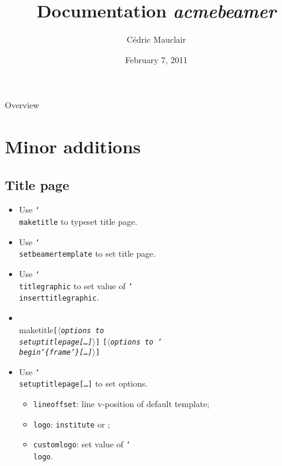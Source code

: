 \documentclass[utf8, a4paper]{beamer}
\newcommand*\cs[1]{\texttt{\char`\\#1}}
\newcommand*\meta[1]{\ensuremath{\langle}{\em#1}\ensuremath{\rangle}}
\newcommand*\oarg[1]{\texttt{[#1]}}
\newcommand*\benv[1]{\texttt{\char`\\begin\char`\{#1\char`\}}}
\newcommand*\pkg[1]{{\rmfamily\itshape #1}}
\let\type\texttt
\newcommand*\default[1]{\underbar{#1}}
\begin{document}
\title{Documentation \pkg{acmebeamer}}
\author{Cédric Mauclair}
\date{February 7, 2011}

\maketitle

\begin{frame}{Overview}
  \tableofcontents
\end{frame}

\section{Minor additions}

\subsection{Title page}

\begin{frame}[fragile]

  \begin{itemize}
  \item Use \cs{maketitle} to typeset title page.
  \item Use \cs{setbeamertemplate} to set title page.
  \item Use \cs{titlegraphic} to set value of \cs{inserttitlegraphic}.
  \end{itemize}

  \vfill
  \begin{itemize}
  \item
\begin{semiverbatim}
\\maketitle\oarg{\meta{options to \\setuptitlepage\oarg{…}}}
          \oarg{\meta{options to \benv{frame}\oarg{…}}}
\end{semiverbatim}
  \item Use \cs{setuptitlepage}\oarg{…} to set options.
    \begin{itemize}
    \item \type{lineoffset}: line v-position of default template;
    \item \type{logo}: \type{institute} or \type{\default{none}};
    \item \type{customlogo}: set value of \cs{logo}.
    \end{itemize}
  \end{itemize}

\end{frame}
\end{document}
